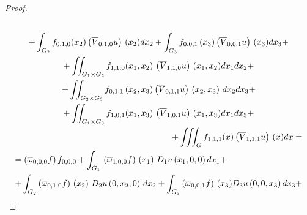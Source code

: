 \begin{proof}
\begin{multline}
\\

{+\int_{G_2 }f_{0, 1, 0}( x_2) \left( \overline{V}%

_{0, 1, 0}u\right) \,( x_2) d{x}_2 +\int_{G_3 }f_{0, 0, 1}\left(

x_3 \right) \left( \overline{V}_{0, 0, 1}u\right) \,( x_3)

dx_3 +}

\\

+\iint_{G_1 \times G_2 }f_{1, 1, 0}( x_1 ,x_2 )

\,\left( \overline{V}_{1, 1, 0}u\right) \,( x_1 ,x_2 )

dx_1 dx_2 +

\\

+\iint_{G_2 \times G_3 }f_{0, 1, 1}\left(

x_2 ,x_3 \right) \left( \overline{V}_{0, 1, 1}u\right) \,\left(

x_2 ,x_3 \right) \,dx_2 dx_3 +

\\

+\iint_{G_1 \times G_3 }f_{1, 0, 1}( x_1 ,x_3 )

\,\left( \overline{V}_{1, 0, 1}u\right) \,( x_1 ,x_3 )

dx_1 dx_3 +

\\ \hfill

+\iiint_{G}f_{1, 1, 1}(x) \left( \overline{V}%

_{1, 1, 1}u\right) \,(x) dx=

\\

=\left( \overline{\omega }_{0, 0, 0}f\right) 

f_{0, 0, 0}+\int_{G_1 }\,\left( \overline{\omega }_{1, 0, 0}f\right) \,\left(

x_1 \right) \,D_1 u\left( x_1 , 0, 0\right) dx_1 + \hfill

\\

{+\int_{G_2 }\left( \overline{\omega }_{0, 1, 0}f\right) \,\left(

x_2 \right) \,D_2 u\left( 0, x_2 , 0\right) \,dx_2 +\int_{G_3 }\left(

\overline{\omega }_{0, 0, 1}f\right) \,( x_3) D_3 u\left(

0, 0, x_3 \right) dx_3 +}

\\


\end{multline}
\end{proof}
